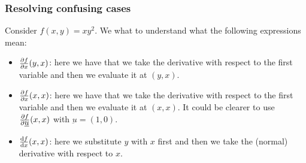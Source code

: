 \documentclass[10pt]{extarticle}
\newcommand{\munderbar}[1]{\underbar{\ensuremath{#1}}}
\begin{document}
\subsubsection{Resolving confusing cases}

Consider $f(x, y) = xy^2$. We what to understand what the following expressions mean:

\begin{itemize}
    \item $\pdv{f}{x}()(y,x)$: here we have that we take the derivative with respect to the first variable and then we evaluate it at $(y, x)$.
    \item $\pdv{f}{x}()(x,x)$: here we have that we take the derivative with respect to the first variable and then we evaluate it at $(x, x)$. It could be clearer to use $\pdv{f}{\munderbar{u}}()(x,x)$ with $\munderbar{u} = (1, 0)$.
    \item $\dv{f}{x}()(x,x)$: here we substitute $y$ with $x$ first and then we take the (normal) derivative with respect to $x$.
\end{itemize}
\end{document}
